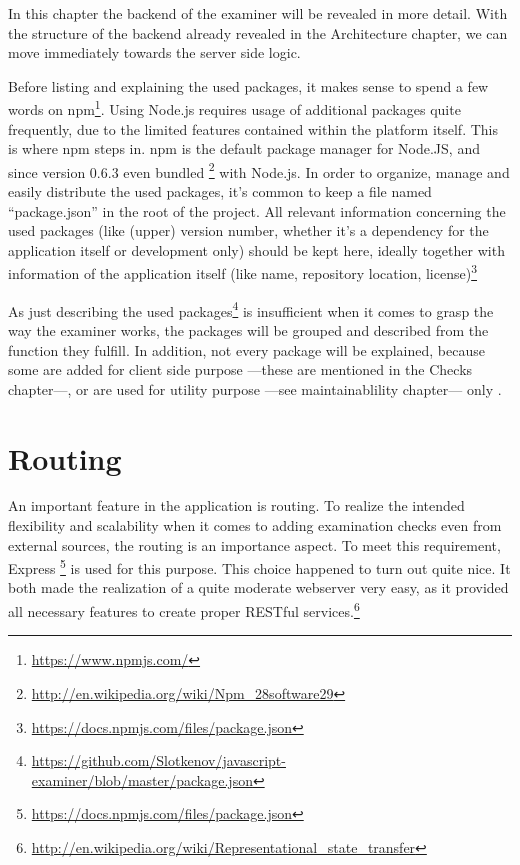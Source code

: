 In this chapter the backend of the \gls{examiner} will be revealed in more 
detail. With the structure of the backend already revealed in the Architecture 
chapter, we can move immediately towards the server side logic.

Before listing and explaining the used packages, it makes sense to spend a few 
words on npm\footnote{\url{https://www.npmjs.com/}}. Using Node.js requires
usage of additional packages quite frequently, due to the limited
features contained within the platform itself. This is where npm steps in. npm
is the default package manager for Node.JS, and since version 0.6.3 even bundled
\footnote{\url{http://en.wikipedia.org/wiki/Npm_28software29}} with Node.js.
In order to organize, manage and easily distribute the used packages, it's
common to keep a file named ``package.json'' in the root of the project. All 
relevant information concerning the used packages (like (upper) version number,
whether it's a dependency for the application itself or development only) should 
be kept here, ideally together with information of the application 
itself (like name, repository location,
license)\footnote{\url{https://docs.npmjs.com/files/package.json}}

As just describing the used 
packages\footnote{\url{https://github.com/Slotkenov/javascript-examiner/blob/master/package.json}}
is insufficient when it comes to grasp the way the \gls{examiner} works, the 
packages will be grouped and described from the function they fulfill. In
addition, not every package will be explained, because some are added for client
side purpose ---these are mentioned in the Checks chapter---, 
or are used for utility purpose ---see maintainablility chapter--- only .

\section{Routing}
An important feature in the application is routing. To realize the intended
flexibility and scalability when it comes to adding examination checks even from
external sources, the routing is an importance aspect. To meet this requirement,
Express \footnote{\url{https://docs.npmjs.com/files/package.json}} is used for
this purpose. This choice happened to turn out quite nice. It both made the
realization of a quite moderate webserver very easy, as it provided all
necessary features to create proper RESTful
services.\footnote{\url{http://en.wikipedia.org/wiki/Representational_state_transfer}}

